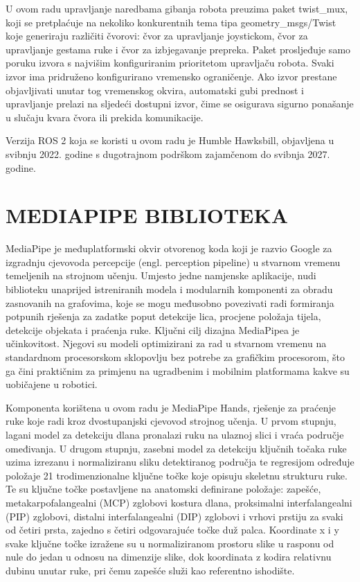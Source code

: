 \documentclass[12pt,a4paper,oneside]{report}
\begin{document}
U ovom radu upravljanje naredbama gibanja robota preuzima paket twist\_mux, koji se pretplaćuje na nekoliko 
konkurentnih tema tipa geometry\_msgs/Twist koje generiraju različiti čvorovi: čvor za upravljanje joystickom, 
čvor za upravljanje gestama ruke i čvor za izbjegavanje prepreka. Paket prosljeđuje samo poruku izvora s 
najvišim konfiguriranim prioritetom upravljaču robota. Svaki izvor ima pridruženo konfigurirano vremensko 
ograničenje. Ako izvor prestane objavljivati unutar tog vremenskog okvira, automatski gubi prednost i 
upravljanje prelazi na sljedeći dostupni izvor, čime se osigurava sigurno ponašanje u slučaju kvara čvora 
ili prekida komunikacije. 

Verzija ROS 2 koja se koristi u ovom radu je Humble Hawksbill, objavljena u svibnju 2022. godine s 
dugotrajnom podrškom zajamčenom do svibnja 2027. godine.

\chapter{MEDIAPIPE BIBLIOTEKA}
MediaPipe je međuplatformski okvir otvorenog koda koji je razvio Google za izgradnju cjevovoda percepcije 
(engl. perception pipeline) u stvarnom vremenu temeljenih na strojnom učenju. Umjesto jedne namjenske 
aplikacije, nudi biblioteku unaprijed istreniranih modela i modularnih komponenti za obradu zasnovanih na 
grafovima, koje se mogu međusobno povezivati radi formiranja potpunih rješenja za zadatke poput detekcije 
lica, procjene položaja tijela, detekcije objekata i praćenja ruke. Ključni cilj dizajna MediaPipea je 
učinkovitost. Njegovi su modeli optimizirani za rad u stvarnom vremenu na standardnom procesorskom 
sklopovlju bez potrebe za grafičkim procesorom, što ga čini praktičnim za primjenu na ugradbenim i 
mobilnim platformama kakve su uobičajene u robotici.

Komponenta korištena u ovom radu je MediaPipe Hands, rješenje za praćenje ruke koje radi kroz dvostupanjski 
cjevovod strojnog učenja. U prvom stupnju, lagani model za detekciju dlana pronalazi ruku na ulaznoj slici i 
vraća područje omeđivanja. U drugom stupnju, zasebni model za detekciju ključnih točaka ruke uzima izrezanu 
i normaliziranu sliku detektiranog područja te regresijom određuje položaje 21 trodimenzionalne ključne 
točke koje opisuju skeletnu strukturu ruke. Te su ključne točke postavljene na anatomski definirane položaje: 
zapešće, metakarpofalangealni (MCP) zglobovi kostura dlana, proksimalni interfalangealni (PIP) zglobovi, 
distalni interfalangealni (DIP) zglobovi i vrhovi prstiju za svaki od četiri prsta, zajedno s četiri 
odgovarajuće točke duž palca. Koordinate x i y svake ključne točke izražene su u normaliziranom prostoru 
slike u rasponu od nule do jedan u odnosu na dimenzije slike, dok koordinata z kodira relativnu dubinu unutar 
ruke, pri čemu zapešće služi kao referentno ishodište.
\end{document}
